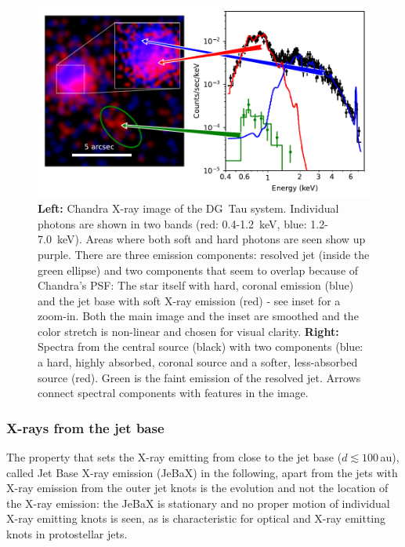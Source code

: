 \begin{figure}[t]

\includegraphics[width=\textwidth]{figs/DGTau.pdf}
\caption{{\bf Left: } Chandra X-ray image of the DG~Tau system. Individual photons are shown in two bands (red: 0.4-1.2~keV, blue: 1.2-7.0~keV). Areas where both soft and hard photons are seen show up purple. There are three emission components: resolved jet (inside the green ellipse) and two components that seem to overlap because of Chandra's PSF: The star itself with hard, coronal emission (blue) and the jet base with soft X-ray emission (red) - see inset for a zoom-in. Both the main image and the inset are smoothed  and the color stretch is non-linear and chosen for visual clarity.
         {\bf Right: } Spectra from the central source (black) with two components (blue: a hard, highly absorbed, coronal source and a softer, less-absorbed source (red). Green is the faint emission of the resolved jet. Arrows connect spectral components with features in the image. \label{fig:dg_tau_X}}
\end{figure}

\subsubsection{X-rays from the jet base}
The property that sets the X-ray emitting from close to the jet base  ($d\lesssim100\,$au), called Jet Base X-ray emission (JeBaX) in the following, apart from the jets with X-ray emission from the outer jet knots is the  evolution  and not the location of the X-ray emission:
the JeBaX is stationary and no proper motion of individual X-ray emitting knots is seen, as is characteristic for optical and X-ray emitting knots in protostellar jets.

